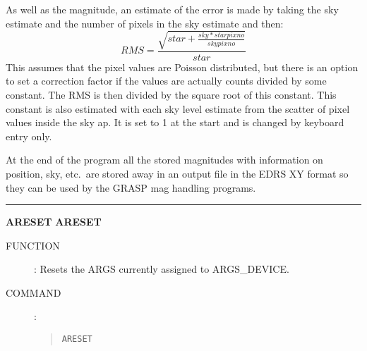 \begin{description}
As well as the magnitude, an estimate of the error is made by taking the sky
estimate and the number of pixels in the sky estimate and then:
\[RMS = \frac {\sqrt{star + \frac{sky * starpixno}{skypixno}}}{star}\]
This assumes that the pixel values are Poisson distributed, but there is an
option to set a correction factor if the values are actually counts divided
by some constant.
The RMS is then divided by the square root of this constant.
This constant is also estimated with each sky level estimate from the scatter
of pixel values inside the sky ap.
It is set to 1 at the start and is changed by keyboard entry only.

At the end of the program all the stored magnitudes with information on
position, sky, etc.\ are stored away in an output file in the EDRS XY format
so they can be used by the GRASP mag handling programs.
\end{description}

\goodbreak
\rule{\textwidth}{0.3mm}
{\Large {\bf ARESET} \hfill {\bf ARESET}}
\begin{description}
\item [FUNCTION]:
Resets the ARGS currently assigned to ARGS\_DEVICE.
\item [COMMAND]:
\begin{quote}
{\tt ARESET}
\end{quote}
\end{description}

